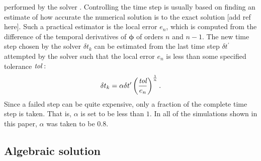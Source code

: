 \documentclass[aps,preprint]{revtex4}
\begin{document}
performed by the solver \cite{Shampine}. Controlling the time step is usually
based on finding an estimate of how accurate the numerical solution is to the
exact solution [add ref here]. Such a practical estimator is the local error
$e_{n}$, which is computed from the difference of the temporal derivatives of
$\mathbf{\phi}$ of orders $n$ and $n-1$. The new time step chosen by the
solver $\delta t _{k} $ can be estimated from the last time step $\delta t
^{\prime}$ attempted by the solver such that the local error $e_{n}$ is less
than some specified tolerance $\emph{tol}:$%
\begin{equation}
\delta t _{k}=\alpha\delta t ^{\prime}\left(  \frac{\emph{tol}}{e_{n}}\right)
^{\frac{1}{n}}.
\end{equation}
Since a failed step can be quite expensive, only a fraction of the complete
time step is taken. That is, $\alpha$ is set to be less than $1$. In all of
the simulations shown in this paper, $\alpha$ was taken to be $0.8$.


\subsection{Algebraic solution}
\end{document}
